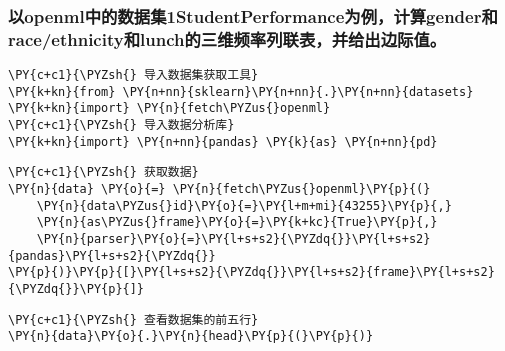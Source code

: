     \hypertarget{ux4ee5openmlux4e2dux7684ux6570ux636eux96c61studentperformanceux4e3aux4f8bux8ba1ux7b97genderux548craceethnicityux548clunchux7684ux4e09ux7ef4ux9891ux7387ux5217ux8054ux8868ux5e76ux7ed9ux51faux8fb9ux9645ux503c}{%
\subsubsection{以openml中的数据集1StudentPerformance为例，计算gender和race/ethnicity和lunch的三维频率列联表，并给出边际值。}\label{ux4ee5openmlux4e2dux7684ux6570ux636eux96c61studentperformanceux4e3aux4f8bux8ba1ux7b97genderux548craceethnicityux548clunchux7684ux4e09ux7ef4ux9891ux7387ux5217ux8054ux8868ux5e76ux7ed9ux51faux8fb9ux9645ux503c}}

    \begin{tcolorbox}[breakable, size=fbox, boxrule=1pt, pad at break*=1mm,colback=cellbackground, colframe=cellborder]
\begin{Verbatim}[commandchars=\\\{\}]
\PY{c+c1}{\PYZsh{} 导入数据集获取工具}
\PY{k+kn}{from} \PY{n+nn}{sklearn}\PY{n+nn}{.}\PY{n+nn}{datasets} \PY{k+kn}{import} \PY{n}{fetch\PYZus{}openml}
\PY{c+c1}{\PYZsh{} 导入数据分析库}
\PY{k+kn}{import} \PY{n+nn}{pandas} \PY{k}{as} \PY{n+nn}{pd}
\end{Verbatim}
\end{tcolorbox}

    \begin{tcolorbox}[breakable, size=fbox, boxrule=1pt, pad at break*=1mm,colback=cellbackground, colframe=cellborder]
\begin{Verbatim}[commandchars=\\\{\}]
\PY{c+c1}{\PYZsh{} 获取数据}
\PY{n}{data} \PY{o}{=} \PY{n}{fetch\PYZus{}openml}\PY{p}{(}
    \PY{n}{data\PYZus{}id}\PY{o}{=}\PY{l+m+mi}{43255}\PY{p}{,}
    \PY{n}{as\PYZus{}frame}\PY{o}{=}\PY{k+kc}{True}\PY{p}{,}
    \PY{n}{parser}\PY{o}{=}\PY{l+s+s2}{\PYZdq{}}\PY{l+s+s2}{pandas}\PY{l+s+s2}{\PYZdq{}}
\PY{p}{)}\PY{p}{[}\PY{l+s+s2}{\PYZdq{}}\PY{l+s+s2}{frame}\PY{l+s+s2}{\PYZdq{}}\PY{p}{]}
\end{Verbatim}
\end{tcolorbox}

    \begin{tcolorbox}[breakable, size=fbox, boxrule=1pt, pad at break*=1mm,colback=cellbackground, colframe=cellborder]
\begin{Verbatim}[commandchars=\\\{\}]
\PY{c+c1}{\PYZsh{} 查看数据集的前五行}
\PY{n}{data}\PY{o}{.}\PY{n}{head}\PY{p}{(}\PY{p}{)}
\end{Verbatim}
\end{tcolorbox}

